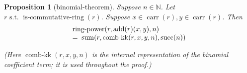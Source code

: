 \documentclass[11pt]{article}
\theoremstyle{plain}
\newtheorem{proposition}{Proposition}
\begin{document}
\begin{proposition}[binomial-theorem]
Suppose $n \in \mathbb{N}$. Let $r \text{ s.t. } \operatorname{is\text{-}commutative\text{-}ring}(r)$. Suppose $x \in \operatorname{carr}(r), y \in \operatorname{carr}(r)$. Then
\begin{equation*}
\begin{array}{@{}l@{}} \operatorname{ring\text{-}power}(r, \operatorname{add}(r)(x, y), n) \\ =\; \operatorname{sum}(r, \operatorname{comb\text{-}kk}(r, x, y, n), \operatorname{succ}(n)) \end{array}
\end{equation*}


\noindent\emph{(Here $\operatorname{comb\text{-}kk}(r, x, y, n)$ is the internal representation of the binomial coefficient term; it is used throughout the proof.)}

\end{proposition}
\end{document}
